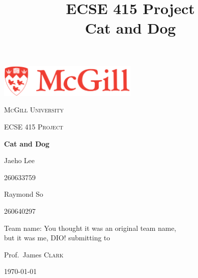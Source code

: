 \documentclass[conference,compsoc]{IEEEtran}
\begin{document}
\begin{titlepage}
	\centering
	\includegraphics[width=0.5\textwidth]{McGill_Logo}\par\vspace{1cm}
	{\scshape\LARGE McGill University \par}
	\vspace{1cm}
	{\scshape\Large ECSE 415 Project\par}
	\vspace{1.5cm}
	{\huge\bfseries Cat and Dog\par}
	\vspace{2cm}
	{\Large Jaeho Lee\par}
	{ 260633759\par}{			\par}	{		\par} {\Large Raymond So \par} {260640297 \par}{Team name: You thought it was an original team name, \\but it was me, DIO!}
	\vfill
	submitting to\par
	Prof.~James \textsc{Clark}

	\vfill

	{\large \today\par}
\end{titlepage}
%
\title{ECSE 415 Project\\ Cat and Dog}
\author{
}

\maketitle
\end{document}
